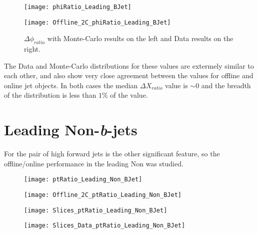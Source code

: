 		\begin{figure}[h]
			\centering
			\begin{minipage}[h]{0.33\linewidth}
				\texttt{[image: phiRatio\_Leading\_BJet]}
				
			\end{minipage}
			\quad
			\begin{minipage}[h]{0.33\linewidth}
				\texttt{[image: Offline\_2C\_phiRatio\_Leading\_BJet]}
			\end{minipage}
			\caption{$\Delta \phi_{ratio}$ with Monte-Carlo results on the left and Data results on the right.}
			\label{fig:O:leadingbphi}
		\end{figure}
		
		The Data and Monte-Carlo distributions for these values are extermely similar to each other, and also show very close agreement between the values for offline and online jet objects. In both cases the median $\Delta X_{ratio}$ value is $\sim0$ and the breadth of the distribution is less than $1\%$ of the value. 
		

\section{Leading Non-\textit{b}-jets}
	\label{OP:leadingnonb}
	
	For \VBFHBB the pair of high \pt forward jets is the other significant feature, so the offline/online performance in the leading Non \bjet was studied.
	
	
	\begin{figure}[h]
		\centering
		\begin{minipage}[h]{0.33\linewidth}
			\texttt{[image: ptRatio\_Leading\_Non\_BJet]}
			
		\end{minipage}
		\quad
		\begin{minipage}[h]{0.33\linewidth}
			\texttt{[image: Offline\_2C\_ptRatio\_Leading\_Non\_BJet]}
		\end{minipage}
		\caption{}
		\label{fig:O:leadingnonbpt}
	\end{figure}
	
	\begin{figure}[h]
		\centering
		
		\begin{minipage}[h]{0.33\linewidth}
			\texttt{[image: Slices\_ptRatio\_Leading\_Non\_BJet]}
		\end{minipage}
		\quad
		\begin{minipage}[h]{0.33\linewidth}
			\texttt{[image: Slices\_Data\_ptRatio\_Leading\_Non\_BJet]}
		\end{minipage}
		\caption{ }
		\label{fig:O:leadingnonbptslice}
	\end{figure}
	
